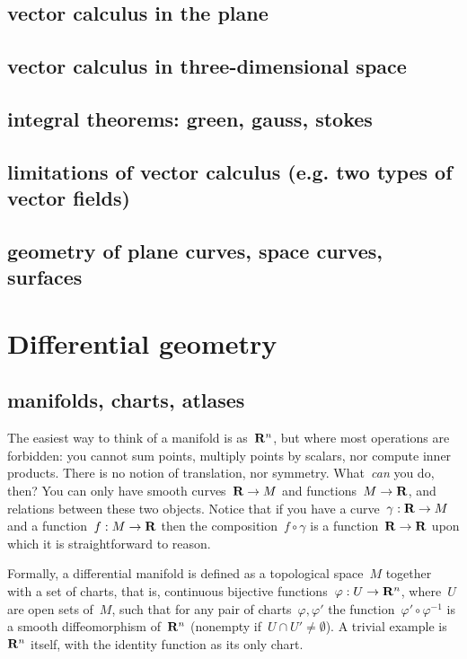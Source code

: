 \subsection{vector calculus in the plane}

\subsection{vector calculus in three-dimensional space}

\subsection{integral theorems: green, gauss, stokes}

\subsection{limitations of vector calculus (e.g. two types of vector fields)}

\subsection{geometry of plane curves, space curves, surfaces}


\clearpage
\section{Differential geometry}


\subsection{manifolds, charts, atlases}

The easiest way to think of a manifold is as~$\mathbf{R}^n$, but where most operations
are forbidden: you cannot sum points, multiply points by scalars,
nor compute inner products.  There is no notion of translation, nor
symmetry.  What~\emph{can} you do, then?  You can only have smooth
curves~$\mathbf{R}\to M$ and functions~$M\to\mathbf{R}$, and relations between
these two objects.  Notice that if you have a curve~$\gamma:\mathbf{R}\to M$ and a
function~$f:M\to\mathbf{R}$ then the composition~$f\circ\gamma$ is a
function~$\mathbf{R}\to\mathbf{R}$ upon which it is straightforward to reason.

Formally, a differential manifold is defined as a topological space~$M$
together with a set of charts, that is, continuous bijective
functions~$\varphi:U\to\mathbf{R}^n$, where~$U$ are open sets of~$M$, such that for
any pair of charts~$\varphi,\varphi'$ the
function~$\varphi'\circ\varphi^{-1}$ is a smooth diffeomorphism of~$\mathbf{R}^n$
(nonempty if~$U\cap U'\neq\emptyset$).  A trivial example is~$\mathbf{R}^n$ itself,
with the identity function as its only chart.

